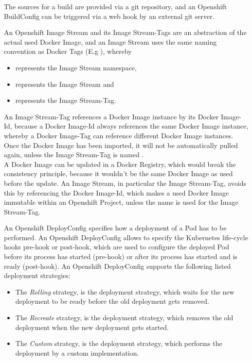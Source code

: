 The sources for a build are provided via a git repository, and an Openshift BuildConfig can be triggered via a web hook by an external git server\cite{S2I2018, OpenshiftBuildStrategies2018}. 

An Openshift Image Stream and its Image Stream-Tags are an abstraction of the actual used Docker Image, and an Image Stream uses the same naming convention as Docker Tags (E.g ), whereby
\begin{itemize}
	\item {} represents the Image Stream namespace,
	\item {} represents the Image Stream and
	\item {} represents the Image Stream-Tag.
\end{itemize}
An Image Stream-Tag references a Docker Image instance by its Docker Image-Id, because a Docker Image-Id always references the same Docker Image instance, whereby a Docker Image-Tag can reference different Docker Image instances. Once the Docker Image has been imported, it will not be automatically pulled again, unless the Image Stream-Tag is named . \\

A Docker Image can be updated in a Docker Registry, which would break the consistency principle, because it wouldn't be the same Docker Image as used before the update. An Image Stream, in particular the Image Stream-Tag, avoids this by referencing the Docker Image-Id, which makes a used Docker Image immutable within an Openshift Project, unless the name  is used for the Image Stream-Tag\cite{OpenshiftBuildAndImageStreams2018}.

An Openshift DeployConfig specifies how a deployment of a Pod has to be performed. An Openshift DeployConfig allows to specify the Kubernetes life-cycle hooks pre-hook or post-hook, which are used to configure the deployed Pod before its process has started (pre-hook) or after its process has started and is ready (post-hook). An Openshift DeployConfig supports the following listed deployment strategies\cite{OpenshiftDeployments2018}:
\begin{itemize}
	\item The \emph{Rolling} strategy, is the deployment strategy, which waits for the new deployment to be ready before the old deployment gets removed.
	\item The \emph{Recreate} strategy, is the deployment strategy, which removes the old deployment when the new deployment gets started.
	\item The \emph{Custom} strategy, is the deployment strategy, which performs the deployment by a custom implementation.
\end{itemize}

